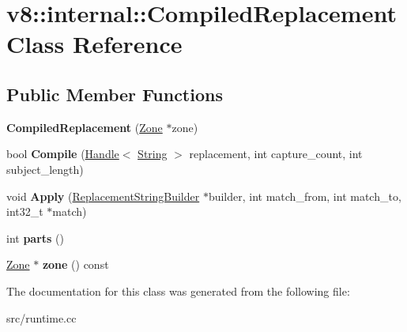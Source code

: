 \hypertarget{classv8_1_1internal_1_1_compiled_replacement}{}\section{v8\+:\+:internal\+:\+:Compiled\+Replacement Class Reference}
\label{classv8_1_1internal_1_1_compiled_replacement}
\subsection*{Public Member Functions}
\begin{DoxyCompactItemize}
\item 
\hypertarget{classv8_1_1internal_1_1_compiled_replacement_af765df3b9de1cb70e4e76fe1852152aa}{}{\bfseries Compiled\+Replacement} (\hyperlink{classv8_1_1internal_1_1_zone}{Zone} $\ast$zone)\label{classv8_1_1internal_1_1_compiled_replacement_af765df3b9de1cb70e4e76fe1852152aa}

\item 
\hypertarget{classv8_1_1internal_1_1_compiled_replacement_a6bbbb9e7adf3f4c001030aed4c1f73b5}{}bool {\bfseries Compile} (\hyperlink{classv8_1_1internal_1_1_handle}{Handle}$<$ \hyperlink{classv8_1_1internal_1_1_string}{String} $>$ replacement, int capture\+\_\+count, int subject\+\_\+length)\label{classv8_1_1internal_1_1_compiled_replacement_a6bbbb9e7adf3f4c001030aed4c1f73b5}

\item 
\hypertarget{classv8_1_1internal_1_1_compiled_replacement_af54fff6c76ff6a26e3d57fa97cded113}{}void {\bfseries Apply} (\hyperlink{classv8_1_1internal_1_1_replacement_string_builder}{Replacement\+String\+Builder} $\ast$builder, int match\+\_\+from, int match\+\_\+to, int32\+\_\+t $\ast$match)\label{classv8_1_1internal_1_1_compiled_replacement_af54fff6c76ff6a26e3d57fa97cded113}

\item 
\hypertarget{classv8_1_1internal_1_1_compiled_replacement_a89a5f2e577223ea684b32d007383748b}{}int {\bfseries parts} ()\label{classv8_1_1internal_1_1_compiled_replacement_a89a5f2e577223ea684b32d007383748b}

\item 
\hypertarget{classv8_1_1internal_1_1_compiled_replacement_ac7ab3d4e9f1d0cb3a8ed38bd9c23e8f6}{}\hyperlink{classv8_1_1internal_1_1_zone}{Zone} $\ast$ {\bfseries zone} () const \label{classv8_1_1internal_1_1_compiled_replacement_ac7ab3d4e9f1d0cb3a8ed38bd9c23e8f6}

\end{DoxyCompactItemize}


The documentation for this class was generated from the following file\+:\begin{DoxyCompactItemize}
\item 
src/runtime.\+cc\end{DoxyCompactItemize}
